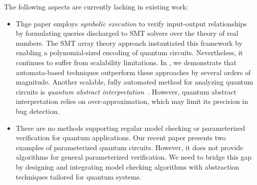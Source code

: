 The following aspects are currently lacking in existing work:
%
\begin{itemize}
\item
Thge paper \cite{BauerMarquartLS23} employs \emph{symbolic execution} \cite{10.1145/360248.360252} to verify input-output relationships by formulating queries discharged to SMT solvers over the theory of real numbers.
%
The SMT array theory approach \cite{DBLP:conf/cade/ChenRT23} instantiated this framework by enabling a polynomial-sized encoding of quantum circuits. Nevertheless, it continues to suffer from scalability limitations.
%
In \cite{DBLP:journals/pacmpl/AbdullaCCHLLLT25,PLanQC25}, we demonstrate that automata-based techniques outperform these approaches by several orders of magnitude.
%
Another scalable, fully automated method for analyzing quantum circuits is \emph{quantum abstract interpretation}~\cite{yu2021quantum,perdrix2008quantum}.
%
However, quantum abstract interpretation relies on over-approximation, which may limit its precision in bug detection.
%

\item
There are no methods supporting regular model checking or parameterized verification for quantum applications.
%
Our recent paper \cite{DBLP:journals/pacmpl/AbdullaCCHLLLT25} presents two examples of parameterized quantum circuits.
%
However, it does not provide algorithms for general parameterized verification.
%
We need to bridge this gap by designing and integrating model checking algorithms with abstraction techniques tailored for quantum systems.
\end{itemize}
